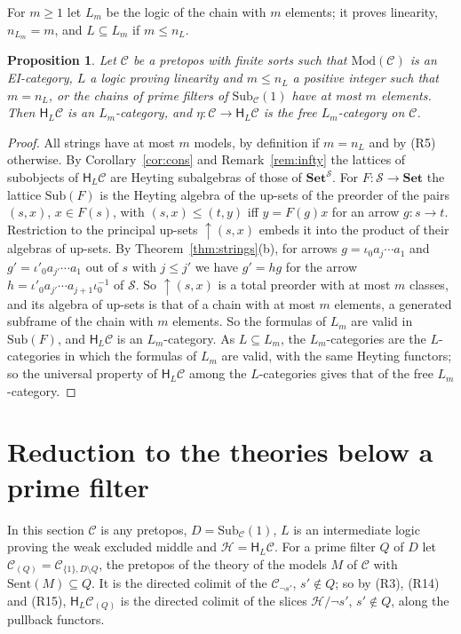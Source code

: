 \documentclass[11pt]{amsart}
\newtheorem{prop}[thm]{Proposition}
\theoremstyle{definition}
\newcommand{\Set}{\mathbf{Set}}
\newcommand{\Sub}{\mathrm{Sub}}
\newcommand{\Mod}{\mathrm{Mod}}
\newcommand{\Sent}{\mathrm{Sent}}
\newcommand{\HH}{\mathsf H}
\newcommand{\cC}{\mathcal C}
\newcommand{\cH}{\mathcal H}
\newcommand{\cS}{\mathcal S}
\begin{document}
For $m\ge1$ let $L_m$ be the logic of the chain with $m$ elements; it
proves linearity, $n_{L_m}=m$, and $L\subseteq L_m$ if $m\le n_L$.

\begin{prop}\label{prop:Lm}
Let $\cC$ be a pretopos with finite sorts such that $\Mod(\cC)$ is an
EI-category, $L$ a logic proving linearity and $m\le n_L$ a positive
integer such that $m=n_L$, or the chains of prime filters of
$\Sub_\cC(1)$ have at most $m$ elements. Then $\HH_L\cC$ is an
$L_m$-category, and $\eta\colon\cC\to\HH_L\cC$ is the free
$L_m$-category on $\cC$.
\end{prop}
\begin{proof}
All strings have at most $m$ models, by definition if $m=n_L$ and by
(R5) otherwise. By
Corollary~\ref{cor:cons} and Remark~\ref{rem:infty} the lattices of
subobjects of $\HH_L\cC$ are Heyting subalgebras of those of
$\Set^\cS$. For $F\colon\cS\to\Set$ the lattice $\Sub(F)$ is the
Heyting algebra of the up-sets of the preorder of the pairs $(s,x)$,
$x\in F(s)$, with $(s,x)\le(t,y)$ iff $y=F(g)x$ for an arrow $g\colon
s\to t$. Restriction to the principal up-sets ${\uparrow}(s,x)$ embeds
it into the product of their algebras of up-sets. By
Theorem~\ref{thm:strings}(b), for arrows $g=\iota_0a_j\cdots a_1$ and
$g'=\iota'_0a_{j'}\cdots a_1$ out of $s$ with $j\le j'$ we have
$g'=hg$ for the arrow $h=\iota'_0a_{j'}\cdots a_{j+1}\iota_0^{-1}$ of
$\cS$. So ${\uparrow}(s,x)$ is a total preorder with at most $m$
classes, and its algebra of up-sets is that of a chain with at most
$m$ elements, a generated subframe of the chain with $m$ elements. So
the formulas of $L_m$ are valid in $\Sub(F)$, and $\HH_L\cC$ is an
$L_m$-category. As $L\subseteq L_m$, the $L_m$-categories are the
$L$-categories in which the formulas of $L_m$ are valid, with the same
Heyting functors; so the universal property of $\HH_L\cC$ among the
$L$-categories gives that of the free $L_m$-category.
\end{proof}

\section{Reduction to the theories below a prime filter}\label{sec:prime}

In this section $\cC$ is any pretopos, $D=\Sub_\cC(1)$, $L$ is an
intermediate logic proving the weak excluded middle and
$\cH=\HH_L\cC$. For a prime filter $Q$ of $D$ let
$\cC_{(Q)}=\cC_{\{1\},D\setminus Q}$, the pretopos of the theory of
the models $M$ of $\cC$ with $\Sent(M)\subseteq Q$. It is the directed
colimit of the $\cC_{\neg s'}$, $s'\notin Q$; so by (R3), (R14) and
(R15), $\HH_L\cC_{(Q)}$ is the directed colimit of the slices
$\cH/\neg s'$, $s'\notin Q$, along the pullback functors.
\end{document}
